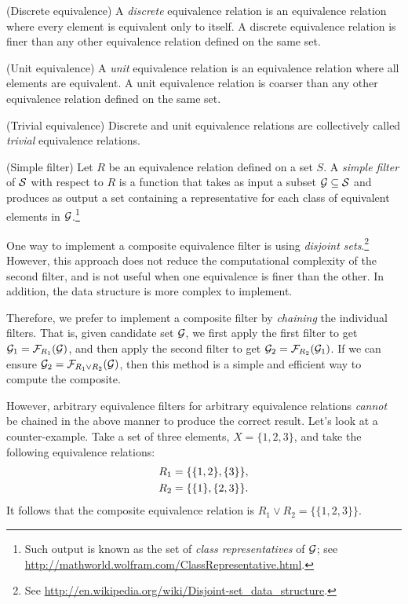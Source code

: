 \begin{definition}
(Discrete equivalence) A \emph{discrete} equivalence relation is an equivalence relation where every element is equivalent only to itself. A discrete equivalence relation is finer than any other equivalence relation defined on the same set.
\end{definition}

\begin{definition}
(Unit equivalence) A \emph{unit} equivalence relation is an equivalence relation where all elements are equivalent. A unit equivalence relation is coarser than any other equivalence relation defined on the same set.
\end{definition}

\begin{definition}
(Trivial equivalence) Discrete and unit equivalence relations are collectively called \emph{trivial} equivalence relations.
\end{definition}

\begin{definition}
(Simple filter) Let $R$ be an equivalence relation defined on a set $S$. A \emph{simple filter} of $\mathcal{S}$ with respect to $R$ is a function that takes as input a subset $\mathcal{G} \subseteq \mathcal{S}$ and produces as output a set containing a representative for each class of equivalent elements in $\mathcal{G}$.\footnote{Such output is known as the set of \emph{class representatives} of $\mathcal{G}$; see \url{http://mathworld.wolfram.com/ClassRepresentative.html}. }
\end{definition}

One way to implement a composite equivalence filter is using \emph{disjoint sets}.\footnote{See \url{http://en.wikipedia.org/wiki/Disjoint-set\_data\_structure}.} However, this approach does not reduce the computational complexity of the second filter, and is not useful when one equivalence is finer than the other. In addition, the data structure is more complex to implement.

Therefore, we prefer to implement a composite filter by \emph{chaining} the individual filters. That is, given candidate set $\mathcal{G}$, we first apply the first filter to get $\mathcal{G}_1 = \mathcal{F}_{R_1}(\mathcal{G})$, and then apply the second filter to get $\mathcal{G}_2 = \mathcal{F}_{R_2}(\mathcal{G}_1)$. If we can ensure $\mathcal{G}_2 = \mathcal{F}_{R_1 \vee R_2}(\mathcal{G})$, then this method is a simple and efficient way to compute the composite.

However, arbitrary equivalence filters for arbitrary equivalence relations \emph{cannot} be chained in the above manner to produce the correct result. Let's look at a counter-example. Take a set of three elements, $X = \{1, 2, 3\}$, and take the following equivalence relations:
\begin{align}
R_1 &= \{ \{1, 2\}, \{3\}  \} , \notag \\
R_2 &= \{ \{1\}, \{2,3\}  \} . \notag 
\end{align}
It follows that the composite equivalence relation is $R_1 \vee R_2 = \{ \{ 1, 2, 3 \} \}$.

